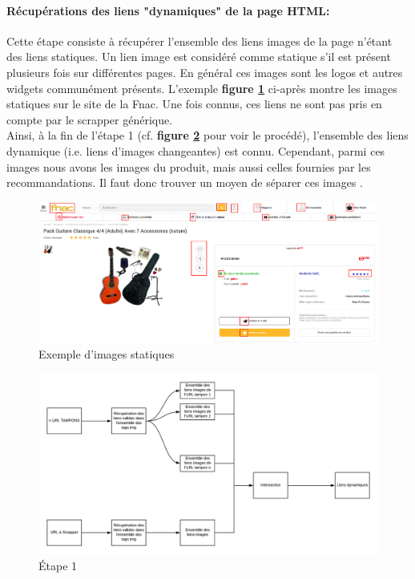 \documentclass{article} %
\begin{document}
\paragraph{Récupérations des liens "dynamiques" de la page HTML:\\}
Cette étape consiste à récupérer l'ensemble des liens images de la page n'étant des liens statiques. Un lien image est considéré comme statique s'il est présent plusieurs fois sur différentes pages. En général ces images sont les logos et autres widgets communément présents. L'exemple \textbf{figure \ref{fig:stats}} ci-après montre les images statiques sur le site de la Fnac. Une fois connus, ces liens ne sont pas pris en compte par le scrapper générique.\\ 
Ainsi, à la fin de l'étape 1 (cf. \textbf{figure \ref{fig:step1}} pour voir le procédé), l'ensemble des liens dynamique (i.e. liens d'images changeantes) est connu. Cependant, parmi ces images nous avons les images du produit, mais aussi celles fournies par les recommandations. Il faut donc trouver un moyen de séparer ces images .

\begin{figure}[!h]
 \centering
 \includegraphics[keepaspectratio = true,scale=0.25]{static.png}
 \caption{Exemple d'images statiques}
 \label{fig:stats}
\end{figure}

 
\begin{figure}[!h]
 \centering
 \includegraphics[keepaspectratio = true,scale=0.4]{step1.png}
 \caption{Étape 1}
 \label{fig:step1}
\end{figure}
\end{document}

